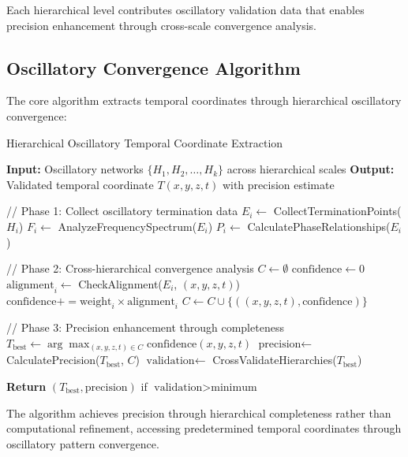 \documentclass[12pt,a4paper]{article}
\begin{document}
Each hierarchical level contributes oscillatory validation data that enables precision enhancement through cross-scale convergence analysis.

\subsection{Oscillatory Convergence Algorithm}

The core algorithm extracts temporal coordinates through hierarchical oscillatory convergence:

\begin{algorithm}
\caption{Hierarchical Oscillatory Temporal Coordinate Extraction}
\begin{algorithmic}
\State \textbf{Input:} Oscillatory networks $\{H_1, H_2, \ldots, H_k\}$ across hierarchical scales
\State \textbf{Output:} Validated temporal coordinate $T(x,y,z,t)$ with precision estimate

\State // Phase 1: Collect oscillatory termination data
    \State $E_i \leftarrow$ CollectTerminationPoints($H_i$)
    \State $F_i \leftarrow$ AnalyzeFrequencySpectrum($E_i$)
    \State $P_i \leftarrow$ CalculatePhaseRelationships($E_i$)
\EndFor

\State // Phase 2: Cross-hierarchical convergence analysis
\State $C \leftarrow \emptyset$
    \State $\text{confidence} \leftarrow 0$
        \State $\text{alignment}_i \leftarrow$ CheckAlignment($E_i$, $(x,y,z,t)$)
        \State $\text{confidence} += \text{weight}_i \times \text{alignment}_i$
    \EndFor
        \State $C \leftarrow C \cup \{((x,y,z,t), \text{confidence})\}$
    \EndIf
\EndFor

\State // Phase 3: Precision enhancement through completeness
\State $T_{\text{best}} \leftarrow \arg\max_{(x,y,z,t) \in C} \text{confidence}(x,y,z,t)$
\State $\text{precision} \leftarrow$ CalculatePrecision($T_{\text{best}}$, $C$)
\State $\text{validation} \leftarrow$ CrossValidateHierarchies($T_{\text{best}}$)

\State \textbf{Return} $(T_{\text{best}}, \text{precision})$ if $\text{validation} > \text{minimum}$
\end{algorithmic}
\end{algorithm}

The algorithm achieves precision through hierarchical completeness rather than computational refinement, accessing predetermined temporal coordinates through oscillatory pattern convergence.
\end{document}
